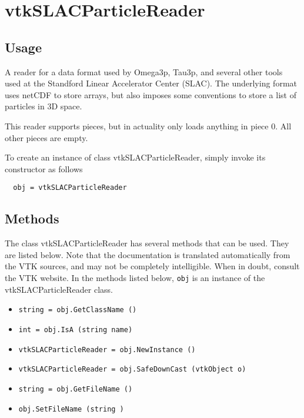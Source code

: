 \section{vtkSLACParticleReader}

\subsection{Usage}


 A reader for a data format used by Omega3p, Tau3p, and several other tools
 used at the Standford Linear Accelerator Center (SLAC).  The underlying
 format uses netCDF to store arrays, but also imposes some conventions
 to store a list of particles in 3D space.
 
 This reader supports pieces, but in actuality only loads anything in
 piece 0.  All other pieces are empty.


To create an instance of class vtkSLACParticleReader, simply
invoke its constructor as follows
\begin{verbatim}
  obj = vtkSLACParticleReader
\end{verbatim}
\subsection{Methods}

The class vtkSLACParticleReader has several methods that can be used.
  They are listed below.
Note that the documentation is translated automatically from the VTK sources,
and may not be completely intelligible.  When in doubt, consult the VTK website.
In the methods listed below, \verb|obj| is an instance of the vtkSLACParticleReader class.
\begin{itemize}
\item  \verb|string = obj.GetClassName ()|

\item  \verb|int = obj.IsA (string name)|

\item  \verb|vtkSLACParticleReader = obj.NewInstance ()|

\item  \verb|vtkSLACParticleReader = obj.SafeDownCast (vtkObject o)|

\item  \verb|string = obj.GetFileName ()|

\item  \verb|obj.SetFileName (string )|

\end{itemize}
